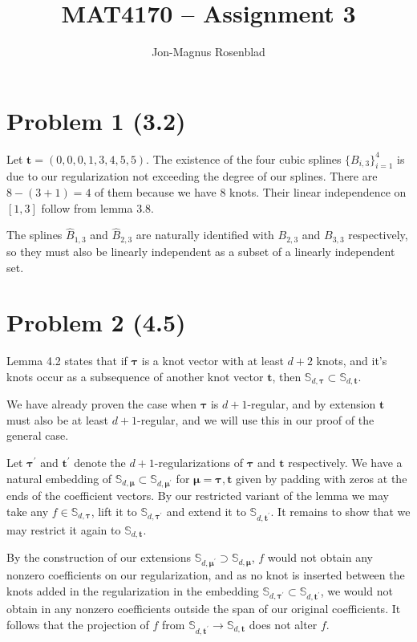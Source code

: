 \documentclass{article}
\title{MAT4170 -- Assignment 3}
\author{Jon-Magnus Rosenblad}
\date{}
\begin{document}
\maketitle

\section*{Problem 1 (3.2)}
Let $\mathbf t = (0,0,0,1,3,4,5,5)$.
The existence of the four cubic splines $\{B_{i,3}\}_{i=1}^4$ is due to our regularization not exceeding the degree of our splines.
There are $8 - (3 + 1) = 4$ of them because we have $8$ knots.
Their linear independence on $[1,3]$ follow from lemma 3.8.

The splines $\hat B_{1,3}$ and $\hat B_{2,3}$ are naturally identified with $B_{2,3}$ and $B_{3,3}$ respectively,
so they must also be linearly independent as a subset of a linearly independent set.

\section*{Problem 2 (4.5)}
Lemma 4.2 states that if $\mathbf \tau$ is a knot vector with at least $d + 2$ knots,
and it's knots occur as a subsequence of another knot vector $\mathbf t$,
then $\mathbb S_{d,\mathbf\tau}\subset \mathbb S_{d,\mathbf t}$.

We have already proven the case when $\mathbf \tau$ is $d + 1$-regular, and by extension $\mathbf t$ must also be at least $d + 1$-regular,
and we will use this in our proof of the general case.

Let $\mathbf \tau^\prime$ and $\mathbf t^\prime$ denote the $d + 1$-regularizations of $\mathbf \tau$ and $\mathbf t$ respectively.
We have a natural embedding of $\mathbb S_{d, \mathbf \mu}\subset \mathbb S_{d, \mathbf \mu^\prime}$ for $\mathbf \mu=\mathbf \tau, \mathbf t$
given by padding with zeros at the ends of the coefficient vectors.
By our restricted variant of the lemma we may take any $f\in\mathbb S_{d, \mathbf \tau}$,
lift it to $\mathbb S_{d, \mathbf \tau^\prime}$ and extend it to $\mathbb S_{d, \mathbf t^\prime}$.
It remains to show that we may restrict it again to $\mathbb S_{d, \mathbf t}$.

By the construction of our extensions $\mathbb S_{d,\mathbf\mu^\prime}\supset \mathbb S_{d, \mathbf \mu}$,
$f$ would not obtain any nonzero coefficients on our regularization,
and as no knot is inserted between the knots added in the regularization in the embedding $\mathbb S_{d,\mathbf \tau^\prime}\subset \mathbb S_{d,\mathbf t^\prime}$,
we would not obtain in any nonzero coefficients outside the span of our original coefficients.
It follows that the projection of $f$ from $\mathbb S_{d,\mathbf t^\prime}\to \mathbb S_{d,\mathbf t}$ does not alter $f$.
\end{document}
